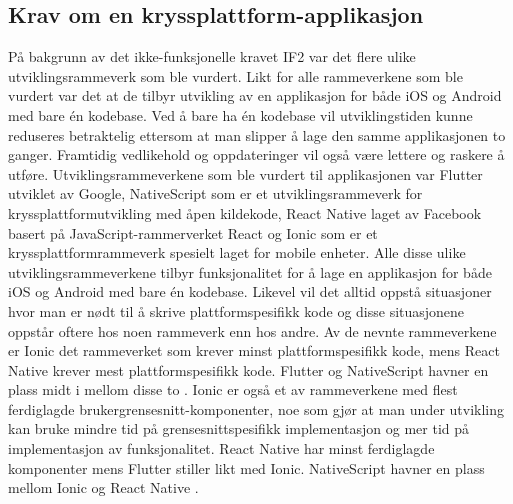 \subsection{Krav om en kryssplattform-applikasjon}
På bakgrunn av det ikke-funksjonelle kravet IF2 var det flere ulike utviklingsrammeverk som ble vurdert. Likt for alle rammeverkene som ble vurdert var det at de tilbyr utvikling av en applikasjon for både iOS og Android med bare én kodebase. Ved å bare ha én kodebase vil utviklingstiden kunne reduseres betraktelig ettersom at man slipper å lage den samme applikasjonen to ganger. Framtidig vedlikehold og oppdateringer vil også være lettere og raskere å utføre. Utviklingsrammeverkene som ble vurdert til applikasjonen var Flutter \cite{FlutterBeautifulNative} utviklet av Google, NativeScript \cite{NativeScript} som er et utviklingsrammeverk for kryssplattformutvikling med åpen kildekode, React Native \cite{ReactNativeFramework} laget av Facebook basert på JavaScript-rammerverket React \cite{ReactJavaScriptLibrary} og Ionic \cite{IonicCrossPlatformMobile} som er et kryssplattformrammeverk spesielt laget for mobile enheter. Alle disse ulike utviklingsrammeverkene tilbyr funksjonalitet for å lage en applikasjon for både iOS og Android med bare én kodebase. Likevel vil det alltid oppstå situasjoner hvor man er nødt til å skrive plattformspesifikk kode og disse situasjonene oppstår oftere hos noen rammeverk enn hos andre. Av de nevnte rammeverkene er Ionic det rammeverket som krever minst plattformspesifikk kode, mens React Native krever mest plattformspesifikk kode. Flutter og NativeScript havner en plass midt i mellom disse to \cite{FrameWorkComparison}. Ionic er også et av rammeverkene med flest ferdiglagde brukergrensesnitt-komponenter, noe som gjør at man under utvikling kan bruke mindre tid på grensesnittspesifikk implementasjon og mer tid på implementasjon av funksjonalitet. React Native har minst ferdiglagde komponenter mens Flutter stiller likt med Ionic. NativeScript havner en plass mellom Ionic og React Native \cite{FrameWorkComparison}.

